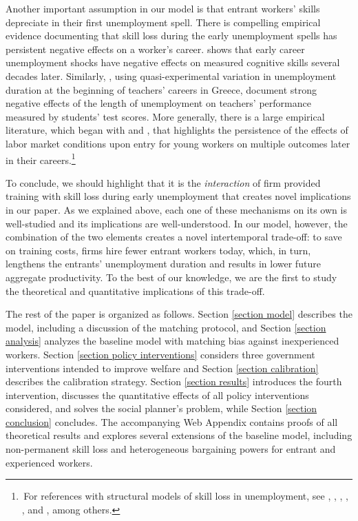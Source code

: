 \documentclass[12pt]{article} %
\theoremstyle{definition}
\begin{document}
Another important assumption in our model is that entrant workers' skills depreciate in their first unemployment spell.
There is compelling empirical evidence documenting that skill loss during the early unemployment spells has persistent negative effects on a worker's career.
\cite{arellano2022effect} shows that early career unemployment shocks have negative effects on measured cognitive skills several decades later. 
Similarly, \cite{dinerstein2022human}, using quasi-experimental variation in unemployment duration at the beginning of teachers' careers in Greece, document strong negative effects of the length of unemployment on teachers' performance measured by students' test scores.
More generally, there is a large empirical literature, which began with \cite{kahn2010long} and \cite{oreopoulos2012short}, that highlights the persistence of the effects of labor market conditions upon entry for young workers on multiple outcomes later in their careers.\footnote{\,For references with structural models of skill loss in unemployment, see \cite{pissarides1992loss}, \cite{ljungqvist1998european}, \cite{coles2000retraining}, \cite{ortego2016unemployment}, \cite{flemming2020skill}, and \cite{kospentaris2021unobserved}, among others.}


To conclude, we should highlight that it is the \textit{interaction} of firm provided training with skill loss during early unemployment that creates novel implications in our paper.
As we explained above, each one of these mechanisms on its own is well-studied and its implications are well-understood.
In our model, however, the combination of the two elements creates a novel intertemporal trade-off: to save on training costs, firms hire fewer entrant workers today, which, in turn, lengthens the entrants' unemployment duration and results in lower future aggregate productivity.
To the best of our knowledge, we are the first to study the theoretical and quantitative implications of this trade-off.


The rest of the paper is organized as follows. Section \ref{section model} describes the model, including a discussion of the matching protocol, and Section \ref{section analysis} analyzes the baseline model with matching bias against inexperienced workers. Section \ref{section policy interventions} considers three government interventions intended to improve welfare and Section \ref{section calibration} describes the calibration strategy. Section \ref{section results} introduces the fourth intervention, discusses the quantitative effects of all policy interventions considered, and solves the social planner's problem, while Section \ref{section conclusion} concludes. 
The accompanying Web Appendix contains proofs of all theoretical results and explores several extensions of the baseline model, including non-permanent skill loss and heterogeneous bargaining powers for entrant and experienced workers.
\end{document}
